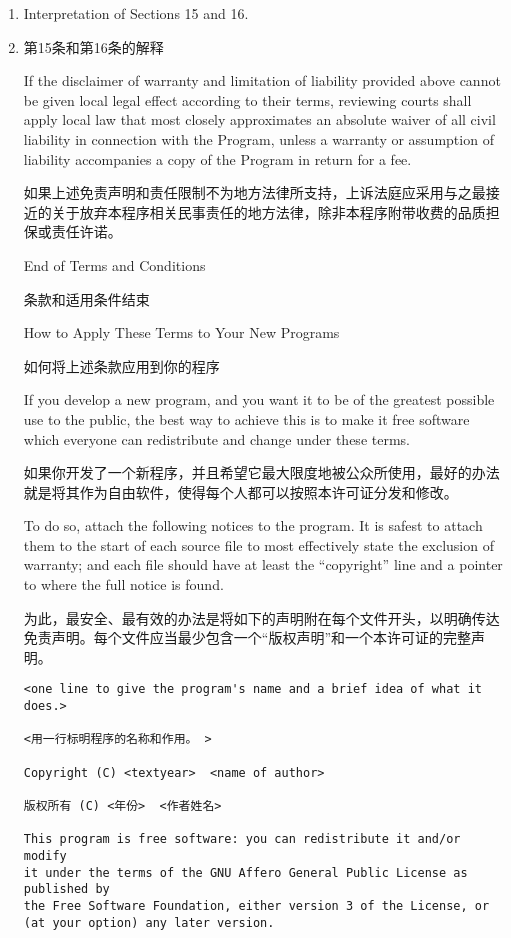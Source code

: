 \documentclass[11pt]{article}
\begin{document}
\begin{enumerate}
\item Interpretation of Sections 15 and 16.
\item 第15条和第16条的解释

If the disclaimer of warranty and limitation of liability provided
above cannot be given local legal effect according to their terms,
reviewing courts shall apply local law that most closely approximates
an absolute waiver of all civil liability in connection with the
Program, unless a warranty or assumption of liability accompanies a
copy of the Program in return for a fee.

如果上述免责声明和责任限制不为地方法律所支持，上诉法庭应采用与之最接近的关于放弃本程序相关民事责任的地方法律，除非本程序附带收费的品质担保或责任许诺。

\begin{center}
{\Large\sc End of Terms and Conditions}

{\Large 条款和适用条件结束}

\bigskip
How to Apply These Terms to Your New Programs

如何将上述条款应用到你的程序
\end{center}

If you develop a new program, and you want it to be of the greatest
possible use to the public, the best way to achieve this is to make it
free software which everyone can redistribute and change under these terms.

如果你开发了一个新程序，并且希望它最大限度地被公众所使用，最好的办法就是将其作为自由软件，使得每个人都可以按照本许可证分发和修改。

To do so, attach the following notices to the program.  It is safest
to attach them to the start of each source file to most effectively
state the exclusion of warranty; and each file should have at least
the ``copyright'' line and a pointer to where the full notice is found.

为此，最安全、最有效的办法是将如下的声明附在每个文件开头，以明确传达免责声明。每个文件应当最少包含一个“版权声明”和一个本许可证的完整声明。

{\footnotesize
\begin{verbatim}
<one line to give the program's name and a brief idea of what it does.>

<用一行标明程序的名称和作用。 >

Copyright (C) <textyear>  <name of author>

版权所有 (C) <年份>  <作者姓名>

This program is free software: you can redistribute it and/or modify
it under the terms of the GNU Affero General Public License as published by
the Free Software Foundation, either version 3 of the License, or
(at your option) any later version.


\end{verbatim}}
\end{enumerate}
\end{document}
